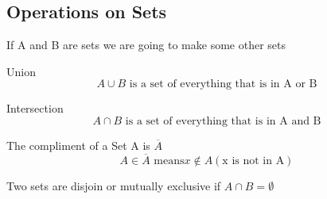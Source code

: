 \documentclass[12pt,a4paper]{article}
\begin{document}
\subsection{Operations on Sets}
If A and B are sets we are going to make some other sets 

\hspace{3pt}

Union 
\begin{equation}
  A \cup B \text{ is a set of everything that is in A or B}
\end{equation}

\begin{center}
\end{center}

Intersection 
\begin{equation}
  A \cap B \text{ is a set of everything that is in A and B}
\end{equation}

\begin{center}
\end{center}

The compliment of a Set A is \( \overline{A} \)
\begin{equation}
  A \in \overline{A} \text{ means} x \notin A (\text{x is not in A})
\end{equation}

Two sets are disjoin or mutually exclusive if \(  A \cap B = \emptyset \)
\end{document}
